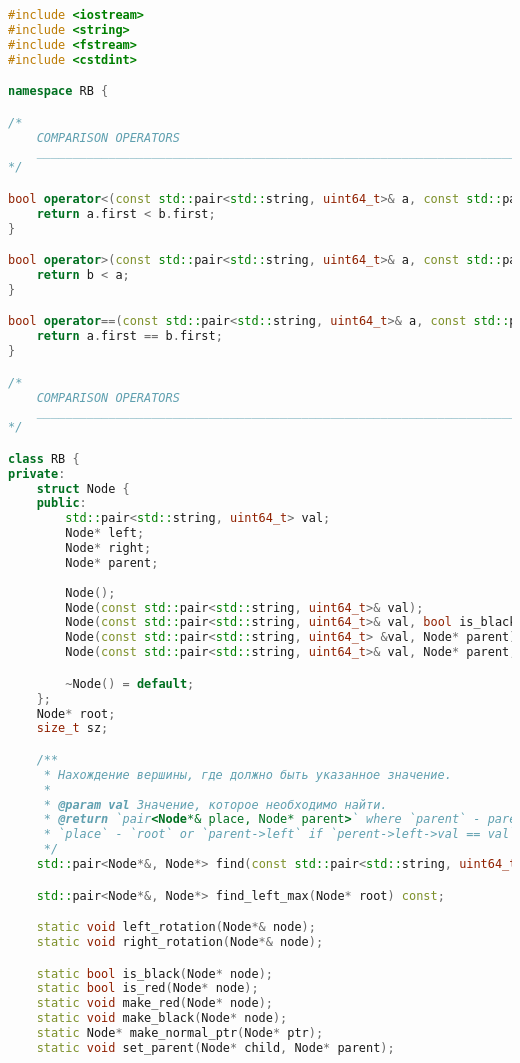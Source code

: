 \begin{lstlisting}[language=C++]
#include <iostream>
#include <string>
#include <fstream>
#include <cstdint>

namespace RB {

/*
    COMPARISON OPERATORS
    ______________________________________________________________________________________________________________________________________
*/

bool operator<(const std::pair<std::string, uint64_t>& a, const std::pair<std::string, uint64_t>& b) {
    return a.first < b.first;
}

bool operator>(const std::pair<std::string, uint64_t>& a, const std::pair<std::string, uint64_t>& b) {
    return b < a;
}

bool operator==(const std::pair<std::string, uint64_t>& a, const std::pair<std::string, uint64_t>& b) {
    return a.first == b.first;
}

/*
    COMPARISON OPERATORS
    ______________________________________________________________________________________________________________________________________
*/

class RB {
private:
    struct Node {
    public:
        std::pair<std::string, uint64_t> val;
        Node* left;
        Node* right;
        Node* parent;
        
        Node();
        Node(const std::pair<std::string, uint64_t>& val);
        Node(const std::pair<std::string, uint64_t>& val, bool is_black);
        Node(const std::pair<std::string, uint64_t> &val, Node* parent);
        Node(const std::pair<std::string, uint64_t>& val, Node* parent, bool is_black);

        ~Node() = default;
    };
    Node* root;
    size_t sz;

    /**
     * Нахождение вершины, где должно быть указанное значение.
     *
     * @param val Значение, которое необходимо найти.
     * @return `pair<Node*& place, Node* parent>` where `parent` - parent for place where `val` must be,
     * `place` - `root` or `parent->left` if `perent->left->val == val` else `parent->right`
     */
    std::pair<Node*&, Node*> find(const std::pair<std::string, uint64_t>& val); // MB CONST

    std::pair<Node*&, Node*> find_left_max(Node* root) const;

    static void left_rotation(Node*& node);
    static void right_rotation(Node*& node);

    static bool is_black(Node* node);
    static bool is_red(Node* node);
    static void make_red(Node* node);
    static void make_black(Node* node);
    static Node* make_normal_ptr(Node* ptr);
    static void set_parent(Node* child, Node* parent);


\end{lstlisting}
